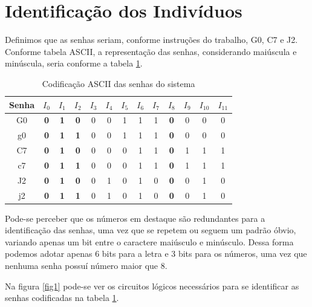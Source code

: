 \documentclass[12pt,a4paper]{article}
\begin{document}
\section{Identificação dos Indivíduos}

Definimos que as senhas seriam, conforme instruções do trabalho, G0, C7 e J2. Conforme tabela ASCII, a representação das senhas, considerando maiúscula e minúscula, seria conforme a tabela \ref{tab1}.

\bigskip

\begin{table}[hb]
\begin{center}
\begin{tabular}{c||cccccccc|cccc}
Senha & $I_0$ & $I_1$ & $I_2$ & $I_3$ & $I_4$ & $I_5$ & $I_6$ & $I_7$ & $I_8$ & $I_9$ & $I_{10}$ & $I_{11}$ \\
\hline
\hline
G0 & {\bf 0} & {\bf 1} & {\bf 0} & 0 & 0 & 1 & 1 & 1 & {\bf 0} & 0 & 0 & 0 \\
g0 & {\bf 0} & {\bf 1} & {\bf 1} & 0 & 0 & 1 & 1 & 1 & {\bf 0} & 0 & 0 & 0 \\
\hline
C7 & {\bf 0} & {\bf 1} & {\bf 0} & 0 & 0 & 0 & 1 & 1 & {\bf 0} & 1 & 1 & 1 \\
c7 & {\bf 0} & {\bf 1} & {\bf 1} & 0 & 0 & 0 & 1 & 1 & {\bf 0} & 1 & 1 & 1 \\
\hline
J2 & {\bf 0} & {\bf 1} & {\bf 0} & 0 & 1 & 0 & 1 & 0 & {\bf 0} & 0 & 1 & 0 \\
j2 & {\bf 0} & {\bf 1} & {\bf 1} & 0 & 1 & 0 & 1 & 0 & {\bf 0} & 0 & 1 & 0 \\
\end{tabular}
\end{center}
\caption{Codificação ASCII das senhas do sistema}
\label{tab1}
\end{table}

Pode-se perceber que os números em destaque são redundantes para a identificação das senhas, uma vez que se repetem ou seguem um padrão óbvio, variando apenas um bit entre o caractere maiúsculo e minúsculo. Dessa forma podemos adotar apenas 6 bits para a letra e 3 bits para os números, uma vez que nenhuma senha possuí número maior que 8.

Na figura \ref{fig1} pode-se ver os circuitos lógicos necessários para se identificar as senhas codificadas na tabela \ref{tab1}.
\end{document}
